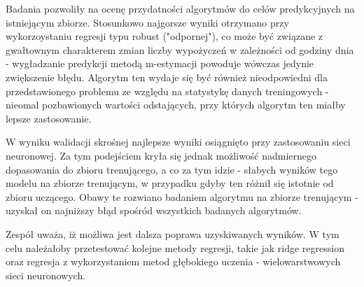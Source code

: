 \documentclass[a4paper,12pt]{article}
\begin{document}
 \par Badania pozwoliły na ocenę przydatności algorytmów do celów predykcyjnych na istniejącym zbiorze. Stosunkowo najgorsze wyniki otrzymano przy wykorzoystaniu regresji typu robust ("odpornej"), co może być związane z gwałtownym charakterem zmian liczby wypożyczeń w zależności od godziny dnia - wygładzanie predykcji metodą m-estymacji powoduje wówczas jedynie zwiększenie błędu. Algorytm ten wydaje się być również nieodpowiedni dla przedstawionego problemu ze względu na statystykę danych treningowych - nieomal pozbawionych wartości odstających, przy których algorytm ten miałby lepsze zastosowanie.
 \par W wyniku walidacji skrośnej najlepsze wyniki osiągnięto przy zastosowaniu sieci neuronowej. Za tym podejściem kryła się jednak możliwość nadmiernego dopasowania do zbioru trenującego, a co za tym idzie - słabych wyników tego modelu na zbiorze trenującym, w przypadku gdyby ten różnił się istotnie od zbioru uczącego. Obawy te rozwiano badaniem algorytmu na zbiorze trenującym - uzyskał on najniższy błąd spośród wszystkich badanych algorytmów.
 \par Zespół uważa, iż możliwa jest dalsza poprawa uzyskiwanych wyników. W tym celu należałoby przetestować kolejne metody regresji, takie jak ridge regression oraz regresja z wykorzystaniem metod głębokiego uczenia - wielowarstwowych sieci neuronowych. 
 
\end{document}

